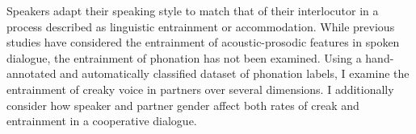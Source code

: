 Speakers adapt their speaking style to match that of their interlocutor in a process described as linguistic entrainment or accommodation. While previous studies have considered the entrainment of acoustic-prosodic features in spoken dialogue, the entrainment of phonation has not been examined. Using a hand-annotated and automatically classified dataset of phonation labels, I examine the entrainment of creaky voice in partners over several dimensions. I additionally consider how speaker and partner gender affect both rates of creak and entrainment in a cooperative dialogue.
